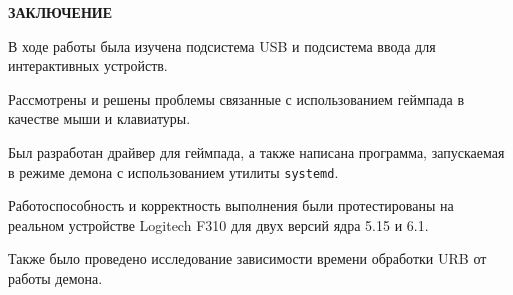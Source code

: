 \begin{center}
    {\bfseries\Large ЗАКЛЮЧЕНИЕ}
\end{center}

В ходе работы была изучена подсистема USB и подсистема ввода для интерактивных устройств.

Рассмотрены и решены проблемы связанные с использованием геймпада в качестве мыши и клавиатуры.

Был разработан драйвер для геймпада, а также написана программа, запускаемая в режиме демона с использованием утилиты \texttt{systemd}.

Работоспособность и корректность выполнения были протестированы на реальном устройстве Logitech F310 для двух версий ядра 5.15 и 6.1.

Также было проведено исследование зависимости времени обработки URB от работы демона.

\pagebreak

